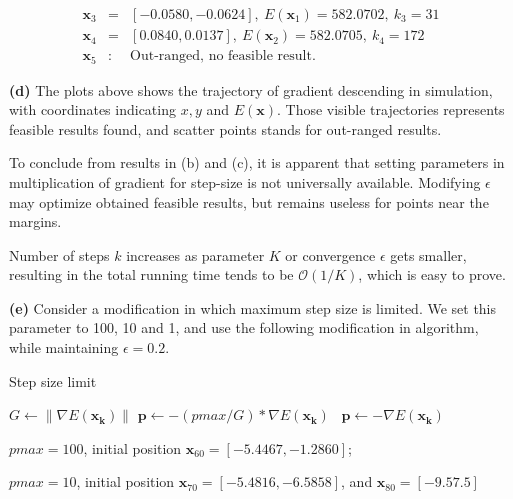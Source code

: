 \documentclass{article}
\begin{document}
\begin{eqnarray*}
\mathbf{x}_{3} &=& [-0.0580,-0.0624],~ E(\mathbf{x}_1) = 582.0702, ~k_3 = 31 \\
\mathbf{x}_{4} &=& [0.0840,0.0137], ~E(\mathbf{x}_2) = 582.0705, ~k_4 = 172\\
\mathbf{x}_{5} &:& \text{Out-ranged, no feasible result}.
\end{eqnarray*}

\noindent
\textbf{(d)} The plots above shows the trajectory of gradient descending in simulation, with coordinates indicating $x,y$ and $E(\mathbf{x})$. Those visible trajectories represents feasible results found, and scatter points stands for out-ranged results.

To conclude from results in (b) and (c), it is apparent that setting parameters in multiplication of gradient for step-size is not universally available. Modifying $\epsilon$ may optimize obtained feasible results, but remains useless for points near the margins.

Number of steps $k$ increases as parameter $K$ or convergence $\epsilon$ gets smaller, resulting in the total running time tends to be $\mathcal{O}(1/K)$, which is easy to prove.

\newpage
\noindent
\textbf{(e)} Consider a modification in which maximum step size is limited. We set this parameter to 100, 10 and 1, and use the following modification in algorithm, while maintaining $\epsilon = 0.2$.

\begin{algorithm}
\caption{Step size limit}\label{euclid}
\begin{algorithmic}[1]
\State $G \gets \|{\nabla E(\mathbf{x_k})}\| $
\State $\mathbf{p} \gets -(pmax/G) * \nabla E(\mathbf{x_k})$
\Else ~$\mathbf{p} \gets -\nabla E(\mathbf{x_k}) $
\EndIf
\end{algorithmic}
\end{algorithm}

$pmax=100$, initial position $\mathbf{x}_{60} = [-5.4467,-1.2860]$;

$pmax=10$, initial position $\mathbf{x}_{70} = [-5.4816,-6.5858]$, and $\mathbf{x}_{80} = [-9.5 7.5]$
\end{document}
